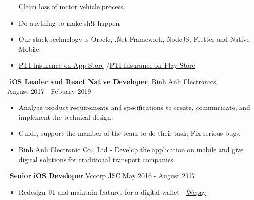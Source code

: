 \documentclass[margin, 10pt]{res}
\begin{document}
\begin{resume}
\begin{itemize}
\begin{minipage}[l]{0.1\linewidth}
	\end{minipage}\hspace{0.2cm}Claim loss of motor vehicle process.
        \item Do anything to make sh!t happen.
        \item Our stack technology is Oracle, .Net Framework, NodeJS, Flutter and Native Mobile.
        \item {\color{blue}\href{https://apps.apple.com/us/developer/pti-insurance/id1253321255}{PTI Insurance on App Store}} /{\color{blue}\href{https://play.google.com/store/apps/developer?id=PTI+Insurance}{PTI Insurance on Play Store}}
   \end{itemize}

   \begin{tabbing}
   \hspace{2.0in}\= \hspace{2.0in}\= \kill %
   {\bf iOS Leader and React Native Developer}, Binh Anh Electronics,\\August 2017 - Febuary 2019
   \end{tabbing}\vspace{0pt} %

   \begin{itemize}
		\item Analyze product requirements and specifications to create, communicate, and implement the technical design. 
		\item Guide, support the member of the team to do their task; Fix serious bugs.
		\item {\color{blue}\href{https://itunes.apple.com/vn/developer/binh-anh-electronic-co-ltd/id1020602455?l=vi&mt=8}{Binh Anh Electronic Co., Ltd}} - Develop the application on mobile and give digital solutions for traditional transport companies.
   \end{itemize}

   \begin{tabbing}
   \hspace{2.0in}\= \hspace{2.0in}\= \kill %
   {\bf Senior iOS Developer} \>Vccorp JSC \>May 2016 - August 2017\\
   \end{tabbing}\vspace{-20pt} %

   \begin{itemize}
		\item Redesign UI and maintain features for a digital wallet - {\color{blue}\href{https://itunes.apple.com/au/app/vi-wepay/id1116328276?mt=8}{Wepay}} 
   \end{itemize}
   

\end{resume}
\end{document}
